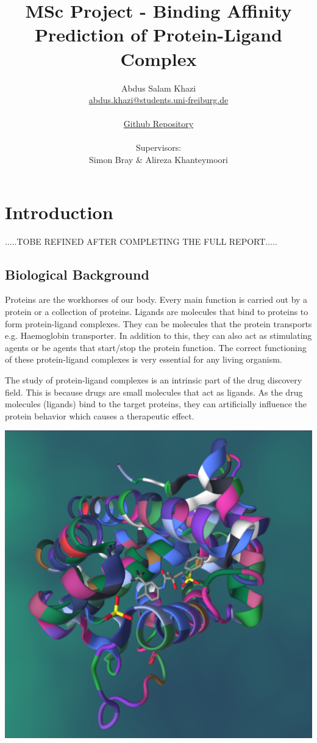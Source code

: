 \documentclass[11pt]{article}
\title{MSc Project - Binding Affinity Prediction of Protein-Ligand Complex}
\author{
        Abdus Salam Khazi\\
        \href{mailto:abdus.khazi@students.uni-freiburg.de}
                {abdus.khazi@students.uni-freiburg.de}\\ \\
        \href{https://github.com/abduskhazi/MSc-Project}
                {Github Repository} \cite{github_repository} \\ \\
        Supervisors:
        \begin{tabular}{ll}
			Simon Bray \&
			Alireza Khanteymoori
		\end{tabular}
       }
\begin{document}
\maketitle
\date{}
\tableofcontents
\newpage

\section{Introduction}
.....TOBE REFINED AFTER COMPLETING THE FULL REPORT.....

\subsection{Biological Background}
Proteins are the workhorses of our body.
Every main function is carried out by a protein or a collection of proteins.
Ligands are molecules that bind to proteins to form protein-ligand complexes.
They can be molecules that the protein transports e.g. Haemoglobin transporter.
In addition to this, they can also act as stimulating agents or be agents that start/stop the protein function.
The correct functioning of these protein-ligand complexes is very essential for any living organism.

The study of protein-ligand complexes is an intrinsic part of the drug discovery field.
This is because drugs are small molecules that act as ligands.
As the drug molecules (ligands) bind to the target proteins, they can artificially influence
the protein behavior which causes a therapeutic effect.

\includegraphics[scale=0.15]{pl_complex}
\cite{PL_complex_introduction}
\end{document}
